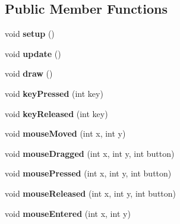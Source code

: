\subsection*{Public Member Functions}
\begin{DoxyCompactItemize}
\item 
void {\bfseries setup} ()\hypertarget{classofApp_af68eaa1366244f7a541cd08e02199c12}{}\label{classofApp_af68eaa1366244f7a541cd08e02199c12}

\item 
void {\bfseries update} ()\hypertarget{classofApp_afef41ea4aee5a22ea530afba33ae7a7b}{}\label{classofApp_afef41ea4aee5a22ea530afba33ae7a7b}

\item 
void {\bfseries draw} ()\hypertarget{classofApp_a75dd45437b9e317db73d8daef1ad49f8}{}\label{classofApp_a75dd45437b9e317db73d8daef1ad49f8}

\item 
void {\bfseries key\+Pressed} (int key)\hypertarget{classofApp_a957d3197364bbac8e67eaa4f15b28ad3}{}\label{classofApp_a957d3197364bbac8e67eaa4f15b28ad3}

\item 
void {\bfseries key\+Released} (int key)\hypertarget{classofApp_aa1503a87453bcfdd395fe4acca5d91a0}{}\label{classofApp_aa1503a87453bcfdd395fe4acca5d91a0}

\item 
void {\bfseries mouse\+Moved} (int x, int y)\hypertarget{classofApp_a158b41a606310db4633fdb817b21047c}{}\label{classofApp_a158b41a606310db4633fdb817b21047c}

\item 
void {\bfseries mouse\+Dragged} (int x, int y, int button)\hypertarget{classofApp_a1ec53d1be799dc275806ff6c6548cd83}{}\label{classofApp_a1ec53d1be799dc275806ff6c6548cd83}

\item 
void {\bfseries mouse\+Pressed} (int x, int y, int button)\hypertarget{classofApp_a2c2ea9c160231e55424dfd98466ef27d}{}\label{classofApp_a2c2ea9c160231e55424dfd98466ef27d}

\item 
void {\bfseries mouse\+Released} (int x, int y, int button)\hypertarget{classofApp_aa3131f1554fc49eaa9ee0f284e48129b}{}\label{classofApp_aa3131f1554fc49eaa9ee0f284e48129b}

\item 
void {\bfseries mouse\+Entered} (int x, int y)\hypertarget{classofApp_aa54e1ffc660d8261617c369c9b29c432}{}\label{classofApp_aa54e1ffc660d8261617c369c9b29c432}


\end{DoxyCompactItemize}
